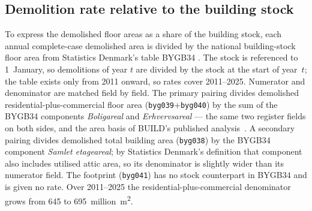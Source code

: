 \subsection{Demolition rate relative to the building stock}\label{sec:rate-vs-stock}
To express the demolished floor areas as a share of the building stock,
each annual complete-case demolished area is divided by the national
building-stock floor area from Statistics Denmark's table BYGB34
. The stock is referenced to 1~January, so demolitions of year
$t$ are divided by the stock at the start of year~$t$; the table exists
only from 2011 onward, so rates cover 2011--2025. Numerator and
denominator are matched field by field. The primary pairing divides
demolished residential-plus-commercial floor area
(\texttt{byg039}+\texttt{byg040}) by the sum of the BYGB34 components
\emph{Boligareal} and \emph{Erhvervsareal} --- the same two register
fields on both sides, and the area basis of BUILD's published
analysis~\cite{jensen2025nedrivning}. A secondary pairing divides
demolished total building area (\texttt{byg038}) by the BYGB34 component
\emph{Samlet etageareal}; by Statistics Denmark's definition that
component also includes utilised attic area, so its denominator is
slightly wider than its numerator field. The footprint
(\texttt{byg041}) has no stock counterpart in BYGB34 and is given no
rate. Over 2011--2025 the residential-plus-commercial denominator grows
from 645 to 695~million~m\textsuperscript{2}.

